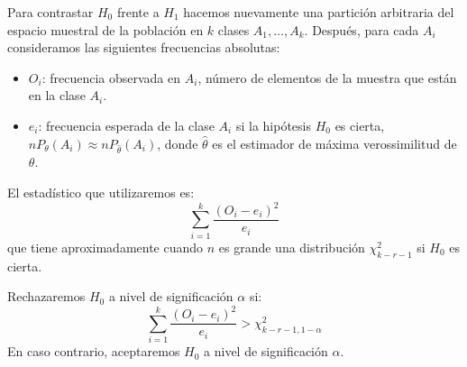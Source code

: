 Para contrastar $H_0$ frente a $H_1$ hacemos nuevamente una partición arbitraria del espacio muestral de la población en $k$ clases $A_1, \dots, A_k$.
Después, para cada $A_i$ consideramos las siguientes frecuencias absolutas:
\begin{itemize}
    \item $O_i$: frecuencia observada en $A_i$, número de elementos de la muestra que están en la clase $A_i$.
    \item $e_i$: frecuencia esperada de la clase $A_i$ si la hipótesis $H_0$ es cierta, $nP_\theta(A_i) \approx nP_{\hat{\theta}}(A_i)$, donde $\hat{\theta}$ es el estimador de máxima verossimilitud de $\theta$.
\end{itemize}

El estadístico que utilizaremos es:
$$\sum_{i=1}^k \frac{(O_i-e_i)^2}{e_i}$$
que tiene aproximadamente cuando $n$ es grande una distribución $\chi^2_{k-r-1}$ si $H_0$ es cierta.

Rechazaremos $H_0$ a nivel de significación $\alpha$ si:
$$\sum_{i=1}^k \frac{(O_i-e_i)^2}{e_i} > \chi^2_{k-r-1, 1-\alpha}$$
En caso contrario, aceptaremos $H_0$ a nivel de significación $\alpha$.

